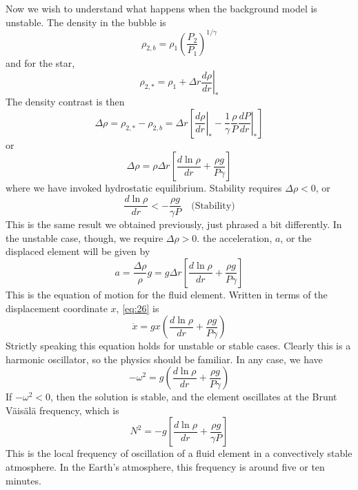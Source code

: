 \documentclass[10pt]{article}
\numberwithin{equation}{section}
\begin{document}
Now we wish to understand what happens when the background model is
unstable. The density in the bubble is
\begin{equation}
  \label{eq:21}
  \rho_{2,b}=\rho_1\left(\frac{P_2}{P_1}\right)^{1/\gamma}
\end{equation}
and for the star,
\begin{equation}
  \label{eq:22}
  \rho_{2,*}=\rho_1+\left.\Delta r\frac{d\rho}{dr}\right|_*
\end{equation}
The density contrast is then
\begin{equation}
  \label{eq:23}
  \Delta \rho=\rho_{2,*}-\rho_{2,b}=\Delta r\left[\left.\frac{d\rho}{dr}
\right|_*-\frac{1}{\gamma}\frac{\rho}{P}\left.\frac{dP}{dr}\right|_*\right]
\end{equation}
or
\begin{equation}
  \label{eq:24}
  \Delta\rho=\rho\Delta r\left[\frac{d\ln\rho}{dr}+\frac{\rho g}{P\gamma}
\right]
\end{equation}
where we have invoked hydrostatic equilibrium. Stability requires
$\Delta\rho<0$, or
\begin{equation}
  \label{eq:25}
  \boxed{\frac{d\ln\rho}{dr}<-\frac{\rho g}{\gamma P}\quad\textrm
{(Stability)}}
\end{equation}
This is the same result we obtained previously, just phrased a bit
differently. In the unstable case, though, we require $\Delta\rho>0$. the
acceleration, $a$, or the displaced element will be given by 
\begin{equation}
  \label{eq:26}
  a=\frac{\Delta\rho}{\rho}g=g\Delta
  r\left[\frac{d\ln\rho}{dr}+\frac{\rho g}{P\gamma}\right]
\end{equation}
This is the equation of motion for the fluid element. Written in
terms of the displacement coordinate $x$, \eqref{eq:26} is
\begin{equation}
  \label{eq:27}
  \ddot{x}=gx\left(\frac{d\ln\rho}{dr}+\frac{\rho g}{P\gamma}\right)
\end{equation}
Strictly speaking this equation holds for unstable or stable
cases. Clearly this is a harmonic oscillator, so the physics should be
familiar. In any case, we have
\begin{equation}
  \label{eq:28}
  -\omega^2=g\left(\frac{d\ln\rho}{dr}+\frac{\rho g}{P \gamma}\right)
\end{equation}
If $-\omega^2<0$, then the solution is stable, and the element
oscillates at the Brunt V\"{a}is\"{a}l\"{a} frequency, which is 
\begin{equation}
  \label{eq:29}
  N^2=-g\left[\frac{d\ln\rho}{dr}+\frac{\rho g}{\gamma P}\right]
\end{equation}
This is the local frequency of oscillation of a fluid element in a
convectively stable atmosphere. In the Earth's atmosphere, this
frequency is around five or ten minutes.\\
\end{document}
